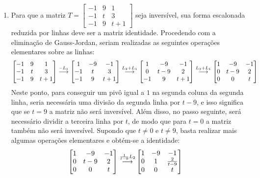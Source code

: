 \documentclass[12pt,a4paper]{article}
\newcommand{\grstep}[2][\relax]{%
   \ensuremath{\mathrel{
       {\mathop{\longrightarrow}\limits^{#2\mathstrut}_{
                                     \begin{subarray}{l} #1 \end{subarray}}}}}}
\begin{document}
\begin{enumerate}
\item Para que a matriz $T =
\begin{bmatrix}
-1 & 9 & 1 \\
-1 & t & 3 \\
-1 & 9 & t + 1
\end{bmatrix}$
seja inversível, sua forma escalonada reduzida por linhas deve ser a matriz identidade. Procedendo com a eliminação de Gauss-Jordan, seriam realizadas as seguintes operações elementares sobre as linhas:
\begin{align*}
\begin{bmatrix}
-1 & 9 & 1 \\
-1 & t & 3 \\
-1 & 9 & t + 1
\end{bmatrix}
\grstep{ -L_1 }
\begin{bmatrix}
1 & -9 & -1 \\
-1 & t & 3 \\
-1 & 9 & t + 1
\end{bmatrix}
\grstep{ L_2 + L_1 }
\begin{bmatrix}
1 & -9 & -1 \\
0 & t-9 & 2 \\
-1 & 9 & t + 1
\end{bmatrix}
\grstep{ L_3 + L_1 }
\begin{bmatrix}
1 & -9 & -1 \\
0 & t-9 & 2 \\
0 & 0 & t
\end{bmatrix}
\end{align*}
Neste ponto, para conseguir um pivô igual a $1$ na segunda coluna da segunda linha, seria necessária uma divisão da segunda linha por $t - 9$, e isso significa que se $t=9$ a matriz não será inversível. Além disso, no passo seguinte, será necessário dividir a terceira linha por $t$, de modo que para $t = 0$ a matriz também não será inversível. Supondo que $t \neq 0$ e $t \neq 9$, basta realizar mais algumas operações elementares e obtém-se a identidade:
\begin{align*}
\begin{bmatrix}
1 & -9 & -1 \\
0 & t-9 & 2 \\
0 & 0 & t
\end{bmatrix}
\grstep{ \frac{1}{t-9} L_2 }
&\begin{bmatrix}
1 & -9 & -1 \\
0 & 1 & \frac{2}{t-9} \\
0 & 0 & t
\end{bmatrix}

\end{align*}
\end{enumerate}
\end{document}
